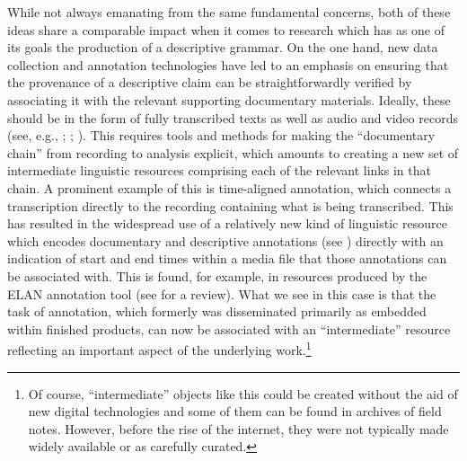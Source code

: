 \documentclass[12pt]{article}
\newcommand\namecite{\citet}
\begin{document}
While not always emanating from the same fundamental concerns, both of these
ideas share a comparable impact when it comes to research which has as one of
its goals the production of a descriptive grammar. On the one hand, new data
collection and annotation technologies have led to an emphasis on ensuring that
the provenance of a descriptive claim can be straightforwardly verified by
associating it with the relevant supporting documentary materials. Ideally,
these should be in the form of fully transcribed texts as well as audio and
video records (see, e.g., \namecite[571]{Bir:Sim:03};
\namecite[299]{Nordhoff:2009}; \namecite{Thieberger:2009}). This requires tools
and methods for making the ``documentary chain'' from recording to analysis
explicit, which amounts to creating a new set of intermediate linguistic
resources comprising each of the relevant links in that chain. A prominent
example of this is time-aligned annotation, which connects a transcription
directly to the recording containing what is being transcribed. This has
resulted in the widespread use of a relatively new kind of linguistic resource
which encodes documentary and descriptive annotations (see
\namecite{SchultzeBerndt:2006}) directly with an indication of start and end
times within a media file that those annotations can be associated with. This is
found, for example, in resources produced by the ELAN annotation tool (see
\namecite{Berez:2007} for a review). What we see in this case is that the task
of annotation, which formerly was disseminated primarily as embedded within
finished products, can now be associated with an ``intermediate'' resource
reflecting an important aspect of the underlying work.{\footnote{Of course,
``intermediate'' objects like this could be created without the aid of new
digital technologies and some of them can be found in archives of field notes.
However, before the rise of the internet, they were not typically made widely
available or as carefully curated.}}
\end{document}
